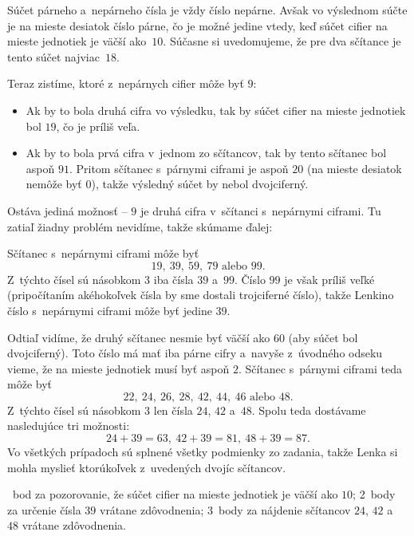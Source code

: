 {%
Súčet párneho a~nepárneho čísla je vždy číslo nepárne.
Avšak vo výslednom súčte je na mieste desiatok číslo párne, čo je možné
jedine vtedy, keď súčet cifier na mieste jednotiek je väčší ako~$10$.
Súčasne si uvedomujeme, že pre dva sčítance je tento súčet najviac~$18$.

Teraz zistíme, ktoré z~nepárnych cifier môže byť $9$:
\begin{itemize}
  \item Ak by to bola druhá cifra vo výsledku, tak by súčet cifier na
    mieste jednotiek bol $19$, čo je príliš veľa.
  \item Ak by to bola prvá cifra v~jednom zo sčítancov, tak by tento
    sčítanec bol aspoň $91$.
    Pritom sčítanec s~párnymi ciframi je aspoň $20$ (na mieste desiatok nemôže
    byť $0$), takže výsledný súčet by nebol dvojciferný.
\end{itemize}
Ostáva jediná možnosť -- $9$ je druhá cifra v~sčítanci s~nepárnymi
ciframi.
Tu zatiaľ žiadny problém nevidíme, takže skúmame ďalej:

Sčítanec s~nepárnymi ciframi môže byť
$$
19,\ 39,\ 59,\ 79\textrm{\ alebo\ }99.
$$
Z~týchto čísel sú násobkom $3$ iba čísla $39$ a~$99$.
Číslo $99$ je však príliš veľké
(pripočítaním akéhokoľvek čísla by sme dostali trojciferné číslo),
takže Lenkino číslo s~nepárnymi ciframi môže byť jedine $39$.

Odtiaľ vidíme, že druhý sčítanec nesmie byť väčší ako $60$ (aby súčet bol
dvojciferný).
Toto číslo má mať iba párne cifry a~navyše z~úvodného odseku vieme, že na
mieste jednotiek musí byť aspoň $2$.
Sčítanec s~párnymi ciframi teda môže byť
$$
22,\ 24,\ 26,\ 28,\ 42,\ 44,\ 46\text{\ alebo\ }48.
$$
Z~týchto čísel sú násobkom $3$ len čísla $24$, $42$ a~$48$.
Spolu teda dostávame nasledujúce tri možnosti:
$$
24+39=63,\ 42+39=81,\ 48+39=87.
$$
Vo všetkých prípadoch sú splnené všetky podmienky zo zadania, takže Lenka si
mohla myslieť ktorúkoľvek z~uvedených dvojíc sčítancov.

~bod za pozorovanie, že súčet cifier na mieste jednotiek je väčší ako $10$;
2~body za určenie čísla $39$ vrátane zdôvodnenia;
3~body za nájdenie sčítancov $24$, $42$ a~$48$ vrátane zdôvodnenia.
\endhodnotenie
}

